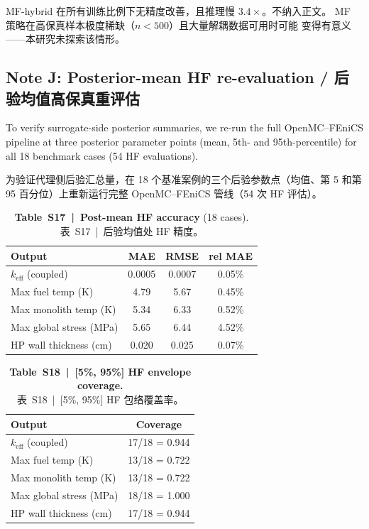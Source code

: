 \documentclass[11pt,a4paper]{article}
\newcommand{\keff}{\ensuremath{k_{\mathrm{eff}}}}
\begin{document}
MF-hybrid 在所有训练比例下无精度改善，且推理慢 $3.4\times$。不纳入正文。
MF 策略在高保真样本极度稀缺（$n < 500$）且大量解耦数据可用时可能
变得有意义——本研究未探索该情形。


\subsection{Note J: Posterior-mean HF re-evaluation /
后验均值高保真重评估}
\label{sec:noteJ}

To verify surrogate-side posterior summaries, we re-run the full
OpenMC--FEniCS pipeline at three posterior parameter points (mean, 5th-
and 95th-percentile) for all 18 benchmark cases (54 HF evaluations).

为验证代理侧后验汇总量，在 18 个基准案例的三个后验参数点（均值、第 5
和第 95 百分位）上重新运行完整 OpenMC--FEniCS 管线（54 次 HF 评估）。

\begin{table}[htbp]
\centering
\caption{\textbf{Table~S17~|~Post-mean HF accuracy} (18 cases).\\
\small 表~S17~|~后验均值处 HF 精度。}
\label{tab:S17}
\smallskip\small
\begin{tabular}{lccc}
\toprule
Output & MAE & RMSE & rel MAE \\
\midrule
\keff{} (coupled)        & 0.0005 & 0.0007 & 0.05\% \\
Max fuel temp (K)        & 4.79   & 5.67   & 0.45\% \\
Max monolith temp (K)    & 5.34   & 6.33   & 0.52\% \\
Max global stress (MPa)  & 5.65   & 6.44   & 4.52\% \\
HP wall thickness (cm)   & 0.020  & 0.025  & 0.07\% \\
\bottomrule
\end{tabular}
\end{table}

\begin{table}[htbp]
\centering
\caption{\textbf{Table~S18~|~[5\%, 95\%] HF envelope coverage.}\\
\small 表~S18~|~[5\%, 95\%] HF 包络覆盖率。}
\label{tab:S18}
\smallskip\small
\begin{tabular}{lc}
\toprule
Output & Coverage \\
\midrule
\keff{} (coupled)        & 17/18 = 0.944 \\
Max fuel temp (K)        & 13/18 = 0.722 \\
Max monolith temp (K)    & 13/18 = 0.722 \\
Max global stress (MPa)  & 18/18 = 1.000 \\
HP wall thickness (cm)   & 17/18 = 0.944 \\
\bottomrule
\end{tabular}
\end{table}
\end{document}

